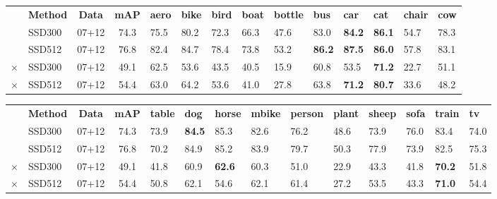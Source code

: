 \begin{footnotesize}
  \begin{center}
    \setlength\tabcolsep{1pt}
    \begin{tabularx}{\textwidth}{rl|c|c|YYYYYYYYYY}
      & \textbf{Method} & \textbf{Data} & \textbf{mAP} & \textbf{aero} & \textbf{bike} & \textbf{bird} & \textbf{boat} & \textbf{bottle} & \textbf{bus} & \textbf{car} & \textbf{cat} & \textbf{chair} & \textbf{cow} \\ 
      & SSD300 & 07+12 & 74.3 & 75.5 & 80.2 & 72.3 & 66.3 & 47.6 & 83.0 & \textbf{84.2} & \textbf{86.1} & 54.7 & 78.3 \\
      & SSD512 & 07+12 & 76.8 & 82.4 & 84.7 & 78.4 & 73.8 & 53.2 & \textbf{86.2} & \textbf{87.5} & \textbf{86.0} & 57.8 & 83.1 \\ 
      $\times$ & SSD300 & 07+12 & 49.1 & 62.5 & 53.6 & 43.5 & 40.5 & 15.9 & 60.8 & 53.5 & \textbf{71.2} & 22.7 & 51.1 \\
      $\times$ & SSD512 & 07+12 & 54.4 & 63.0 & 64.2 & 53.6 & 41.0 & 27.8 & 63.8 & \textbf{71.2} & \textbf{80.7} & 33.6 & 48.2
    \end{tabularx}\vspace{10pt}
    \begin{tabularx}{\textwidth}{rl|c|c|YYYYYYYYYY}
      & \textbf{Method} & \textbf{Data} & \textbf{mAP} & \textbf{table} & \textbf{dog} & \textbf{horse} & \textbf{mbike} & \textbf{person} & \textbf{plant} & \textbf{sheep} & \textbf{sofa} & \textbf{train} & \textbf{tv} \\ 
      & SSD300 & 07+12 & 74.3 & 73.9 & \textbf{84.5} & 85.3 & 82.6 & 76.2 & 48.6 & 73.9 & 76.0 & 83.4 & 74.0 \\
      & SSD512 & 07+12 & 76.8 & 70.2 & 84.9 & 85.2 & 83.9 & 79.7 & 50.3 & 77.9 & 73.9 & 82.5 & 75.3 \\ 
      $\times$ & SSD300 & 07+12 & 49.1 & 41.8 & 60.9 & \textbf{62.6} & 60.3 & 51.0 & 22.9 & 43.3 & 41.8 & \textbf{70.2} & 51.8 \\
      $\times$ & SSD512 & 07+12 & 54.4 & 50.8 & 62.1 & 54.6 & 62.1 & 61.4 & 27.2 & 53.5 & 43.3 & \textbf{71.0} & 54.4
    \end{tabularx}
  \end{center}
\end{footnotesize}

